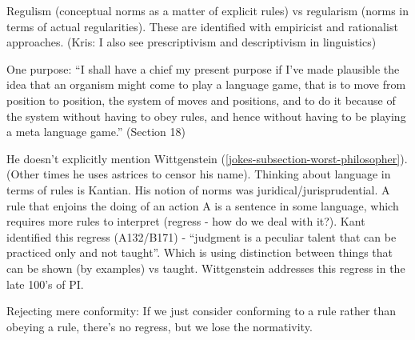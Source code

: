 
Regulism (conceptual norms as a matter of explicit rules) vs regularism (norms in terms of actual regularities). These are identified with empiricist and rationalist approaches. (Kris: I also see prescriptivism and descriptivism in linguistics)

One purpose: ``I shall have a chief my present purpose if I've made plausible the idea that an organism might come to play a language game, that is to move from position to position, the system of moves and positions, and to do it because of the system without having to obey rules, and hence without having to be playing a meta language game.'' (Section 18)

He doesn't explicitly mention Wittgenstein (\ref{jokes-subsection-worst-philosopher}). (Other times he uses astrices to censor his name). Thinking about language in terms of rules is Kantian. His notion of norms was juridical/jurisprudential. A rule that enjoins the doing of an action A is a sentence in some language, which requires more rules to interpret (regress - how do we deal with it?). Kant identified this regress (A132/B171) - ``judgment is a peculiar talent that can be practiced only and not taught''. Which is using distinction between things that can be shown (by examples) vs taught. Wittgenstein addresses this regress in the late 100's of PI.

Rejecting mere conformity: If we just consider conforming to a rule rather than obeying a rule, there's no regress, but we lose the normativity.

